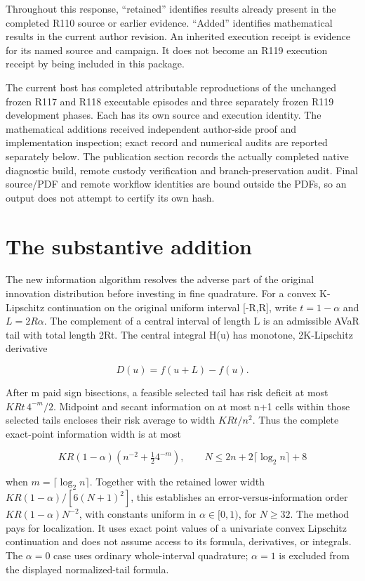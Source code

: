 Throughout this response, ``retained'' identifies results already present in the completed R110 source or earlier evidence. ``Added'' identifies mathematical results in the current author revision. An inherited execution receipt is evidence for its named source and campaign. It does not become an R119 execution receipt by being included in this package.

The current host has completed attributable reproductions of the unchanged frozen R117 and R118 executable episodes and three separately frozen R119 development phases. Each has its own source and execution identity. The mathematical additions received independent author-side proof and implementation inspection; exact record and numerical audits are reported separately below. The publication section records the actually completed native diagnostic build, remote custody verification and branch-preservation audit. Final source/PDF and remote workflow identities are bound outside the PDFs, so an output does not attempt to certify its own hash.

\hypertarget{the-substantive-addition}{%
\section{The substantive addition}\label{the-substantive-addition}}

The new information algorithm resolves the adverse part of the original innovation distribution before investing in fine quadrature. For a convex K-Lipschitz continuation on the original uniform interval {[}-R,R{]}, write \(t=1-\alpha\) and \(L=2R\alpha\). The complement of a central interval of length L is an admissible AVaR tail with total length 2Rt. The central integral H(u) has monotone, 2K-Lipschitz derivative

\[
D(u)=f(u+L)-f(u).
\]

After m paid sign bisections, a feasible selected tail has risk deficit at most \(KRt\,4^{-m}/2\). Midpoint and secant information on at most n+1 cells within those selected tails encloses their risk average to width \(KRt/n^2\). Thus the complete exact-point information width is at most

\[
KR(1-\alpha)\left(n^{-2}+\tfrac12 4^{-m}\right),
\qquad
N\le 2n+2\lceil\log_2 n\rceil+8
\]

when \(m=\lceil\log_2 n\rceil\). Together with the retained lower width \(KR(1-\alpha)/[6(N+1)^2]\), this establishes an error-versus-information order \(KR(1-\alpha)N^{-2}\), with constants uniform in \(\alpha\in[0,1)\), for \(N\ge32\). The method pays for localization. It uses exact point values of a univariate convex Lipschitz continuation and does not assume access to its formula, derivatives, or integrals. The \(\alpha=0\) case uses ordinary whole-interval quadrature; \(\alpha=1\) is excluded from the displayed normalized-tail formula.

